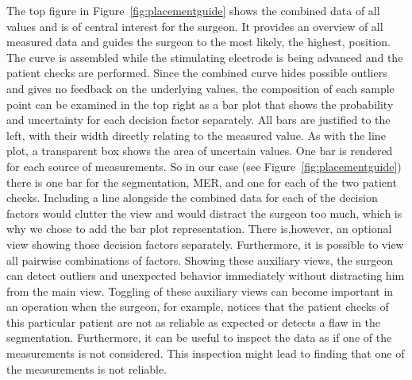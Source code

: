 \documentclass{vgtc}                          %
\begin{document}
The top figure in Figure~\ref{fig:placementguide} shows the combined data of all values and is of central interest for the surgeon. It provides an overview of all measured data and guides the surgeon to the most likely, the highest, position. The curve is assembled while the stimulating electrode is being advanced and the patient checks are performed. Since the combined curve hides possible outliers and gives no feedback on the underlying values, the composition of each sample point can be examined in the top right as a bar plot that shows the probability and uncertainty for each decision factor separately. All bars are justified to the left, with their width directly relating to the measured value. As with the line plot, a transparent box shows the area of uncertain values. One bar is rendered for each source of measurements. So in our case (see Figure~\ref{fig:placementguide}) there is one bar for the segmentation, MER, and one for each of the two patient checks. Including a line alongside the combined data for each of the decision factors would clutter the view and would distract the surgeon too much, which is why we chose to add the bar plot representation. There is,however, an optional view showing those decision factors separately. Furthermore, it is possible to view all pairwise combinations of factors. Showing these auxiliary views, the surgeon can detect outliers and unexpected behavior immediately without distracting him from the main view. Toggling of these auxiliary views can become important in an operation when the surgeon, for example, notices that the patient checks of this particular patient are not as reliable as expected or detects a flaw in the segmentation. Furthermore, it can be useful to inspect the data as if one of the measurements is not considered. This inspection might lead to finding that one of the measurements is not reliable.

\end{document}
